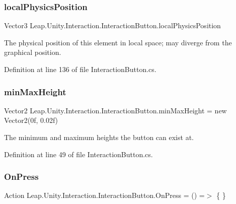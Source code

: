 \subsubsection{\texorpdfstring{localPhysicsPosition}{localPhysicsPosition}}
{\footnotesize\ttfamily Vector3 Leap.\+Unity.\+Interaction.\+Interaction\+Button.\+local\+Physics\+Position\hspace{0.3cm}{\ttfamily [protected]}}



The physical position of this element in local space; may diverge from the graphical position. 



Definition at line 136 of file Interaction\+Button.\+cs.

\mbox{\label{class_leap_1_1_unity_1_1_interaction_1_1_interaction_button_a26f7eabb9d9880d63ab19f7dbeff186a}} 
\subsubsection{\texorpdfstring{minMaxHeight}{minMaxHeight}}
{\footnotesize\ttfamily Vector2 Leap.\+Unity.\+Interaction.\+Interaction\+Button.\+min\+Max\+Height = new Vector2(0f, 0.\+02f)}



The minimum and maximum heights the button can exist at. 



Definition at line 49 of file Interaction\+Button.\+cs.

\mbox{\label{class_leap_1_1_unity_1_1_interaction_1_1_interaction_button_a604925418c20993e8dcd62b44442f02e}} 
\subsubsection{\texorpdfstring{OnPress}{OnPress}}
{\footnotesize\ttfamily Action Leap.\+Unity.\+Interaction.\+Interaction\+Button.\+On\+Press = () =$>$ \{ \}}



